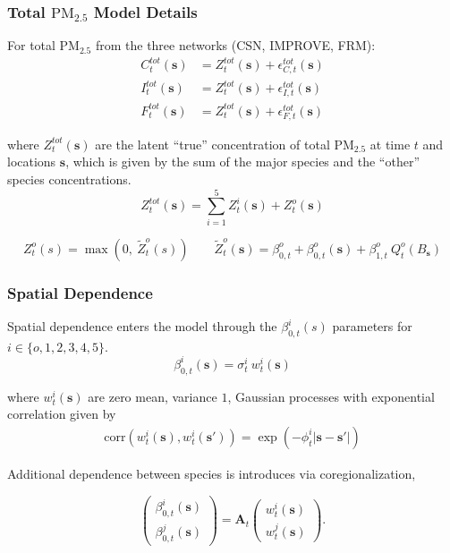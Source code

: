 \documentclass[t]{beamer}\usepackage[]{graphicx}\usepackage[]{color}
\newcommand{\PM}{$\text{PM}_{2.5}$ }
\begin{document}

\begin{frame}
\frametitle{Total \PM Model Details}

For total \PM from the three networks (CSN, IMPROVE, FRM):
%
\begin{align*}
C_t^{tot}(\bm{s}) &= Z_t^{tot}(\bm{s}) + \epsilon_{C,t}^{tot}(\bm{s}) \\
I_t^{tot}(\bm{s}) &= Z_t^{tot}(\bm{s}) + \epsilon_{I,t}^{tot}(\bm{s}) \\
F_t^{tot}(\bm{s}) &= Z_t^{tot}(\bm{s}) + \epsilon_{F,t}^{tot}(\bm{s})
\end{align*}

where $Z_t^{tot}(\bm{s})$ are the latent ``true'' concentration of total \PM at time $t$ and locations $\bm{s}$, which is given by the sum of the major species and the ``other'' species concentrations.
%
\[ Z^{tot}_{t}(\bm{s}) = \sum_{i=1}^{5} Z^i_t(\bm{s}) + Z^{o}_{t}(\bm{s}) \]

{\footnotesize
\[
{Z}_t^o(s) = \max{}\left(0,~\widetilde{Z}_t^o(s)\right) \qquad
\widetilde{Z}_t^{o}(\bm{s}) = \beta_{0,t}^o +\beta_{0,t}^o(\bm{s}) + \beta_{1,t}^o \: Q_t^o(B_{\bm{s}})
\]
}

\end{frame}


\begin{frame}
\frametitle{Spatial Dependence}

Spatial dependence enters the model through the $\beta_{0,t}^i(s)$ parameters for $i \in \{o,1,2,3,4,5\}$.
%
\vspace{1mm}
\[ \beta_{0,t}^i(\bm{s}) = {\sigma}^i_t~w^i_t(\bm{s}) \]
%

where $w^i_{t}(\bm{s})$ are zero mean, variance $1$, Gaussian processes with exponential correlation given by 
%
\vspace{1mm}
\begin{align*}
\text{corr}(w^i_{t}(\bm{s}),w^i_{t}(\bm{s}')) = \exp(-\phi^i_{t} |\bm{s}-\bm{s}'|)
\end{align*}

Additional dependence between species is introduces via coregionalization,

\[
 \left( \begin{array}{cc} \beta^i_{0,t}(\boldsymbol{s})\\ \beta^j_{0,t}(\boldsymbol{s}) \end{array} \right)
 = \boldsymbol{A}_t \left( \begin{array}{cc} w^i_t(\boldsymbol{s})\\ w^j_t(\boldsymbol{s}) \end{array} \right).
\]

\end{frame}
\end{document}

